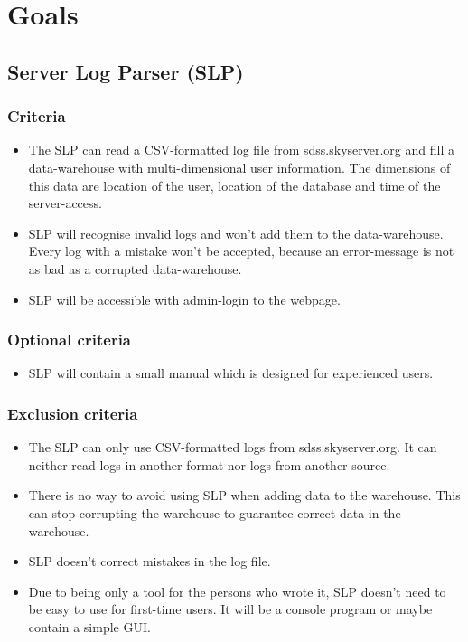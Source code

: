 \section{Goals}


\subsection{Server Log Parser (SLP)}


\subsubsection{Criteria} %
\begin{itemize}
\item The SLP can read a CSV-formatted log file from sdss.skyserver.org
 and fill a data-warehouse with multi-dimensional user information.
 The dimensions of this data are location of the user, location of the 
 database and time of the server-access. 
\item SLP will recognise invalid logs and won't add them to the data-warehouse.
 Every log with a mistake won't be accepted, because an error-message is not 
 as bad as a corrupted data-warehouse. 
\item SLP will be accessible with admin-login to the webpage.
\end{itemize}

\subsubsection{Optional criteria}
\begin{itemize}
\item SLP will contain a small manual which is designed for experienced users.
\end{itemize}

\subsubsection{Exclusion criteria}
\begin{itemize}
\item The SLP can only use CSV-formatted logs from sdss.skyserver.org. 
It can neither read logs in another format nor logs
from another source.
\item There is no way to avoid using SLP when adding data to the warehouse. 
This can stop corrupting the warehouse to guarantee correct data in the warehouse.
\item SLP doesn't correct mistakes in the log file.
\item Due to being only a tool for the persons who wrote it, SLP doesn't need to be easy to use for first-time users.
It will be a console program or maybe contain a simple GUI.
\end{itemize}



